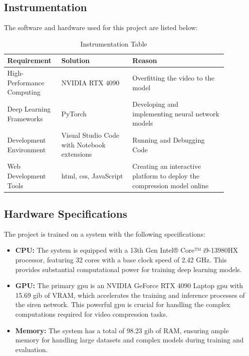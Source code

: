\documentclass{ioereport}
\begin{document}
\subsection{Instrumentation}
    The software and hardware used for this project are listed below: \\
    \begin{table}[H]
        \caption{Instrumentation Table}
        \label{table:instrumentation-table}
        \centering
        \begin{tabular}{|p{0.2\linewidth}|p{0.3\linewidth}|p{0.4\linewidth}|}
            \hline
            \textbf{Requirement} & \textbf{Solution} & \textbf{Reason} \\
            \hline
            High-Performance Computing & NVIDIA RTX 4090 & Overfitting the video to the model \\
            \hline
            Deep Learning Frameworks & PyTorch & Developing and implementing neural network models \\
            \hline
            Development Environment & Visual Studio Code with Notebook extensions & Running and Debugging Code\\
            \hline
            Web Development Tools & \gls{html}, \gls{css}, JavaScript & Creating an interactive platform to deploy the compression model online \\
            \hline
        \end{tabular}
    \end{table}

\subsection{Hardware Specifications}
The project is trained on a system with the following specifications:
    \begin{itemize}
        \item \textbf{CPU:} The system is equipped with a 13th Gen Intel® Core™ i9-13980HX processor, featuring 32 cores with a base clock speed of 2.42 GHz. This provides substantial computational power for training deep learning models.
        \item \textbf{GPU:} The primary \gls{gpu} is an NVIDIA GeForce RTX 4090 Laptop \gls{gpu} with 15.69 \gls{gib} of VRAM, which accelerates the training and inference processes of the \gls{siren} network. This powerful \gls{gpu} is crucial for handling the complex computations required for video compression tasks.
        \item \textbf{Memory:} The system has a total of 98.23 \gls{gib} of RAM, ensuring ample memory for handling large datasets and complex models during training and evaluation.
    \end{itemize}
\end{document}
